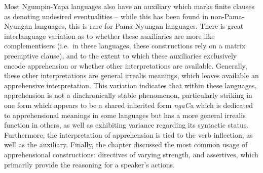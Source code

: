 \documentclass[output=paper,colorlinks,citecolor=brown]{langscibook}
\begin{document}
Most Ngumpin-Yapa languages also have an auxiliary which marks finite clauses as denoting undesired eventualities -- while this has been found in non-Pama-Nyungan languages, this is rare for Pama-Nyungan languages. There is great interlanguage variation as to whether these auxiliaries are more like complementisers (i.e.\  in these languages, these constructions rely on a matrix preemptive clause), and to the extent to which these auxiliaries exclusively encode apprehension or whether other interpretations are available. Generally, these other interpretations are general irrealis meanings, which leaves available an apprehensive interpretation. This variation indicates that within these languages, apprehension is not a diachronically stable phenomenon, particularly striking in one form which appears to be a shared inherited form \textit{ngaCa} which is dedicated to apprehensional meanings in some languages but has a more general irrealis function in others, as well as exhibiting variance regarding its syntactic status. Furthermore, the interpretation of apprehension is tied to the verb inflection, as well as the auxiliary. Finally, the chapter discussed the most common usage of apprehensional constructions: directives of varying strength, and assertives, which primarily provide the reasoning for a speaker's actions. 
\end{document}
